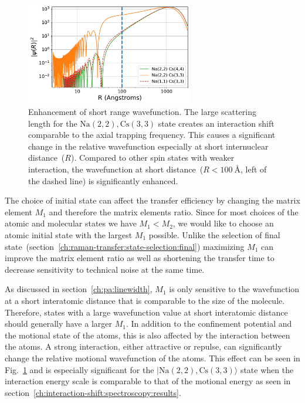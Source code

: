 \begin{figure}
  \centering
  \includegraphics[width=0.65\textwidth]{figures/raman_transfer_atomic_wavefunction.pdf}
  \caption[Enhancement of short range wavefunction]{
    Enhancement of short range wavefunction.
    The large scattering length for the $\mathrm{Na(2,2),Cs(3,3)}$ state
    creates an interaction shift comparable to the axial trapping frequency.
    This causes a significant change in the relative wavefunction especially at short
    internuclear distance~($R$).
    Compared to other spin states with weaker interaction,
    the wavefunction at short distance~($R<100~\text{\AA}$, left of the dashed line)
    is significantly enhanced.
    \label{fig:raman-transfer:atomic-wavefunction}}
\end{figure}

The choice of initial state can affect the transfer efficiency
by changing the matrix element $M_1$ and therefore the matrix elements ratio.
Since for most choices of the atomic and molecular states we have $M_1<M_2$,
we would like to choose an atomic initial state with the largest $M_1$ possible.
Unlike the selection of final state~(section~\ref{ch:raman-transfer:state-selection:final})
maximizing $M_1$ can improve the matrix element ratio as well as
shortening the transfer time to decrease sensitivity to technical noise at the same time.

As discussed in section~\ref{ch:pa:linewidth},
$M_1$ is only sensitive to the wavefunction at a short interatomic distance
that is comparable to the size of the molecule.
Therefore, states with a large wavefunction value at short interatomic distance
should generally have a larger $M_1$.
In addition to the confinement potential and the motional state of the atoms,
this is also affected by the interaction between the atoms.
A strong interaction, either attractive or repulse,
can significantly change the relative motional wavefunction of the atoms.
This effect can be seen in Fig.~\ref{fig:raman-transfer:atomic-wavefunction}
and is especially significant for the $|\mathrm{Na(2,2),Cs(3,3)}\rangle$ state
when the interaction energy scale is comparable to that of the motional energy
as seen in section~\ref{ch:interaction-shift:spectroscopy:results}.

